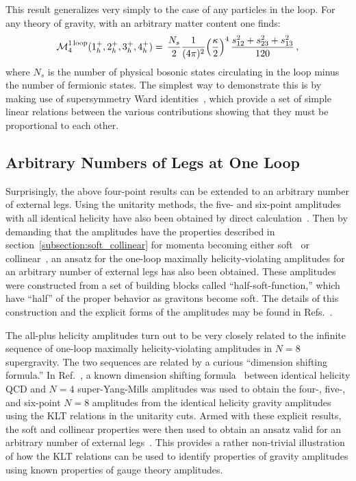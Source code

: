 \documentclass[12pt]{livrev}
\begin{document}
This result generalizes very simply to the case of any particles in
the loop.  For any theory of gravity, with an arbitrary matter content
one finds:
%
\begin{equation}
{\cal M}_4^{\rm 1\, loop} (1^+_h, 2^+_h, 3^+_h, 4^+_h)  =  \, {N_s\over 2}
 {1 \over (4 \pi)^2} 
\Bigl({\kappa\over 2} \Bigr)^4\, 
{s_{12}^2 + s_{23}^2 + s_{13}^2 \over 120} \,, 
\label{FourGravPlusGen}
\end{equation}
%
where $N_s$ is the number of physical bosonic states circulating in
the loop minus the number of fermionic states.  The simplest way to
demonstrate this is by making use of supersymmetry Ward
identities~\cite{Grisaru77SWIB,Parke85SWI,Review}, which provide a set
of simple linear relations between the various contributions showing that
they must be proportional to each other.


\subsection{Arbitrary Numbers of Legs at One Loop}

Surprisingly, the above four-point results can be extended to an
arbitrary number of external legs.  Using the unitarity methods, the
five- and six-point amplitudes with all identical helicity have also
been obtained by direct calculation~\cite{AllPlusGrav,MHVGrav}.  Then
by demanding that the amplitudes have the properties described in
section~\ref{subsection:soft_collinear} for momenta becoming either
soft~\cite{WeinbergSoftG,BGK} or collinear~\cite{AllPlusGrav}, an
ansatz for the one-loop maximally helicity-violating amplitudes for an
arbitrary number of external legs has also been obtained.  These amplitudes
were constructed from a set of building blocks called
``half-soft-function,'' which have ``half'' of the proper behavior as
gravitons become soft.  The details of this construction and the
explicit forms of the amplitudes may be found in
Refs.~\cite{AllPlusGrav,MHVGrav}.

The all-plus helicity amplitudes turn out to be very closely related
to the infinite sequence of one-loop maximally helicity-violating
amplitudes in $N=8$ supergravity.  The two sequences are related by a
curious ``dimension shifting formula.''  In Ref.~\cite{MHVGrav}, a known
dimension shifting formula~\cite{Bern97DimShift} between identical helicity
QCD and $N=4$ super-Yang-Mills amplitudes was used to obtain the
four-, five-, and six-point $N=8$ amplitudes from the identical 
helicity gravity amplitudes using the KLT relations in the 
unitarity cuts.  Armed with these explicit results, the soft and
collinear properties were then used to obtain an ansatz valid for an
arbitrary number of external legs~\cite{MHVGrav}.  This provides a
rather non-trivial illustration of how the KLT relations can be used
to identify properties of gravity amplitudes using known properties of
gauge theory amplitudes.
\end{document}
